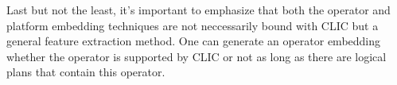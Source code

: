 Last but not the least, it's important to emphasize that both the operator and platform embedding techniques are not neccessarily bound with CLIC but a general feature extraction method. 
One can generate an operator embedding whether the operator is supported by CLIC or not as long as there are logical plans that contain this operator.





